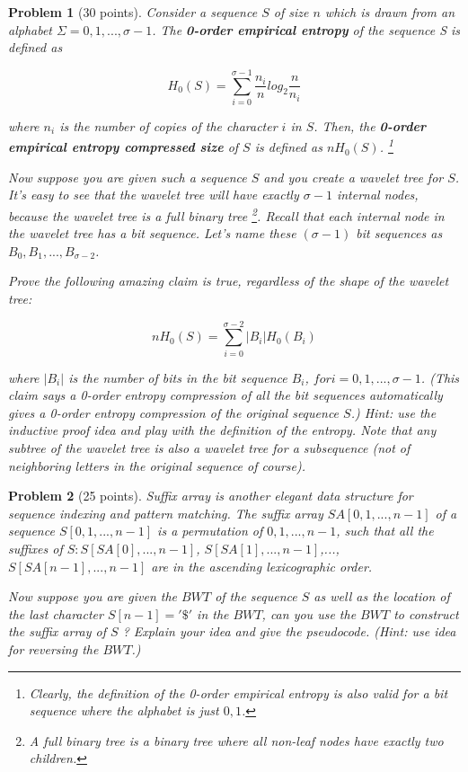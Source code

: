 \documentclass[11pt]{article}
\newtheorem{problem}{Problem}
\begin{document}
\begin{problem}[30 points]
\label{prob:3}
Consider a sequence $S$ of size $n$ which is drawn from an alphabet $\Sigma = {0, 1,..., σ − 1}$. The
\textbf{0-order empirical entropy} of the sequence S is defined as

$$
H_0(S) = \sum_{i=0}^{\sigma-1} \frac{n_i}{n} log_2 \frac{n}{n_i}
$$

where $n_i$ is the number of copies of the character $i$ in $S$. Then, the \textbf{0-order empirical entropy compressed size} of $S$
is defined as $nH_0(S)$. \footnote{Clearly, the definition of the 0-order empirical entropy is also valid for a bit sequence where the alphabet is just ${0, 1}$.} %

Now suppose you are given such a sequence $S$ and you create a wavelet tree for $S$. It’s easy to see that the wavelet
tree will have exactly $\sigma − 1$ internal nodes, because the wavelet tree is a full binary tree \footnote{A full binary tree is a binary tree where all non-leaf nodes have exactly two children.}. Recall that each internal
node in the wavelet tree has a bit sequence. Let’s name these $(\sigma − 1)$ bit sequences as $B_0, B_1,...,B_{\sigma-2}$.

Prove the following amazing claim is true, regardless of the shape of the wavelet tree:

$$
nH_0(S) = \sum_{i=0}^{\sigma-2}|B_i|H_0(B_i)
$$

where $|B_i|$ is the number of bits in the bit sequence $B_i$, $for i = 0, 1,..., \sigma − 1$. (This claim says a 0-order entropy
compression of all the bit sequences automatically gives a 0-order entropy compression of the original sequence $S$.)
Hint: use the inductive proof idea and play with the definition of the entropy. Note that any subtree of the wavelet
tree is also a wavelet tree for a subsequence (not of neighboring letters in the original sequence of course).

\end{problem}




\begin{problem}[25 points]
\label{prob:4}
Suffix array is another elegant data structure for sequence indexing and pattern matching.
The suffix array $SA[0, 1,...,n − 1]$ of a sequence $S[0, 1,...,n − 1]$ is a permutation of ${0, 1,...,n − 1}$, such that
all the suffixes of $S: S[SA[0],...,n − 1]$, $S[SA[1],...,n − 1]$,...,$S[SA[n − 1],...,n − 1]$ are in the ascending
lexicographic order.

Now suppose you are given the $BWT$ of the sequence $S$ as well as the location of the last character $S[n − 1] =' \$'$
in the $BWT$, can you use the $BWT$ to construct the suffix array of $S$ ? Explain your idea and give the pseudocode.
(Hint: use idea for reversing the $BWT$.)

\end{problem}
\end{document}
